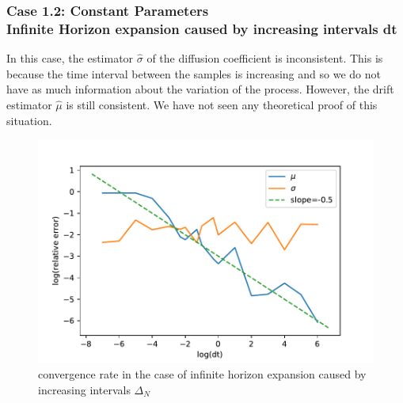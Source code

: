 \documentclass[aspectratio=169]{beamer}\usepackage[utf8]{inputenc}
\begin{document}
\begin{frame}\frametitle{ Case 1.2: Constant Parameters \\
 Infinite Horizon expansion caused by increasing intervals dt }
In this case, the estimator $\hat{\sigma}$ of the diffusion coefficient is inconsistent. This is because the time interval between the samples is increasing and so we do not have as much information about the variation of the process. However, the drift estimator $\hat{\mu}$ is still consistent. We have not seen any theoretical proof of this situation.

\begin{figure}
  \includegraphics[scale=0.45]{Figures/case12v3.pdf}
  \caption{convergence rate in the case of infinite horizon expansion caused by increasing intervals $\Delta_N$}
\end{figure}

\end{frame}
\end{document}

